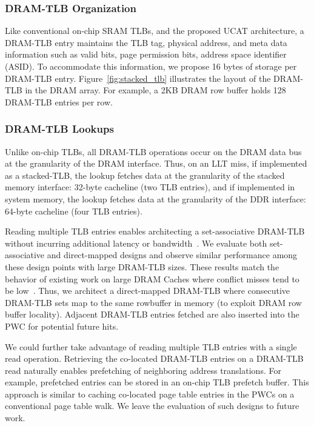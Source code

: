 
\subsubsection{DRAM-TLB Organization}

\noindent Like conventional on-chip SRAM TLBs, and the proposed UCAT
architecture, a DRAM-TLB entry maintains the TLB tag, physical
address, and meta data information such as valid bits, page permission
bits, address space identifier (ASID). To accommodate this
information, we propose 16 bytes of storage per DRAM-TLB entry.
Figure~\ref{fig:stacked_tlb} illustrates the layout of the DRAM-TLB in
the DRAM array. For example, a 2KB DRAM row buffer holds 128 DRAM-TLB
entries per row.

\subsubsection{DRAM-TLB Lookups}

\noindent Unlike on-chip TLBs, all DRAM-TLB operations occur on the
DRAM data bus at the granularity of the DRAM interface. Thus, on an
LLT miss, if implemented as a stacked-TLB, the lookup fetches data at
the granularity of the stacked memory interface: 32-byte cacheline
(two TLB entries), and if implemented in system memory, the lookup
fetches data at the granularity of the DDR interface: 64-byte
cacheline (four TLB entries).

Reading multiple TLB entries enables architecting a set-associative
DRAM-TLB without incurring additional latency or
bandwidth~\cite{moin2012,loh2011}. 
We evaluate both set-associative and direct-mapped
designs and observe similar performance among these design points with large DRAM-TLB sizes.
These results match the behavior of
existing work on large DRAM Caches where conflict misses tend to be
low~\cite{moin2012}. Thus, we architect a direct-mapped DRAM-TLB where
consecutive DRAM-TLB sets map to the same rowbuffer in memory (to
exploit DRAM row buffer locality). Adjacent DRAM-TLB entries fetched
are also inserted into the PWC for potential future hits.

We could further take advantage of reading multiple TLB entries with a
single read operation. Retrieving the co-located DRAM-TLB entries on a
DRAM-TLB read naturally enables prefetching of neighboring address
translations. For example, prefetched entries can be stored in an
on-chip TLB prefetch buffer. This approach is similar to caching
co-located page table entries in the PWCs on a conventional page table
walk. We leave the evaluation of such designs to future work.



